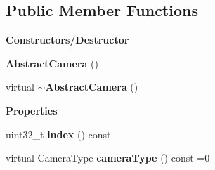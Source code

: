 \subsection*{Public Member Functions}
\begin{Indent}\textbf{ Constructors/\+Destructor}\par
\begin{DoxyCompactItemize}
\item 
\mbox{\label{classrev_1_1_abstract_camera_adb57a53813b8dd94c9c35b9e8839b018}} 
{\bfseries Abstract\+Camera} ()
\item 
\mbox{\label{classrev_1_1_abstract_camera_a86720299e61fc58067a94168ff72163d}} 
virtual {\bfseries $\sim$\+Abstract\+Camera} ()
\end{DoxyCompactItemize}
\end{Indent}
\begin{Indent}\textbf{ Properties}\par
\begin{DoxyCompactItemize}
\item 
\mbox{\label{classrev_1_1_abstract_camera_a71dbb1c655614e7ae08b08f09b4216b5}} 
uint32\+\_\+t {\bfseries index} () const
\item 
\mbox{\label{classrev_1_1_abstract_camera_ae96975e210972a64ec87f030cce3f6bd}} 
virtual Camera\+Type {\bfseries camera\+Type} () const =0
\end{DoxyCompactItemize}
\end{Indent}
